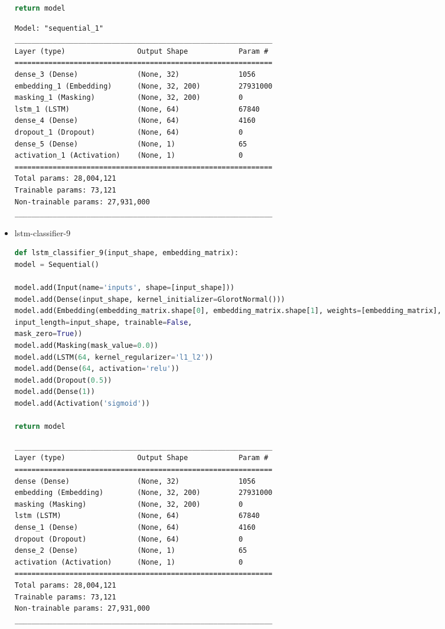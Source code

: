 \documentclass{article}
\begin{document}
\begin{itemize}
\begin{lstlisting}[language=Python, caption=Дефиниция на lstm-classifier-8.]
return model
\end{lstlisting}

\begin{lstlisting}[numbers=none, caption=Обобщение на lstm-classifier-8.]
Model: "sequential_1"
_____________________________________________________________
Layer (type)                 Output Shape            Param #
=============================================================
dense_3 (Dense)              (None, 32)              1056
embedding_1 (Embedding)      (None, 32, 200)         27931000
masking_1 (Masking)          (None, 32, 200)         0
lstm_1 (LSTM)                (None, 64)              67840
dense_4 (Dense)              (None, 64)              4160
dropout_1 (Dropout)          (None, 64)              0
dense_5 (Dense)              (None, 1)               65
activation_1 (Activation)    (None, 1)               0
=============================================================
Total params: 28,004,121
Trainable params: 73,121
Non-trainable params: 27,931,000
_____________________________________________________________
\end{lstlisting}

\item lstm-classifier-9

\begin{lstlisting}[language=Python, caption=Дефиниция на lstm-classifier-9.]
def lstm_classifier_9(input_shape, embedding_matrix):
model = Sequential()

model.add(Input(name='inputs', shape=[input_shape]))
model.add(Dense(input_shape, kernel_initializer=GlorotNormal()))
model.add(Embedding(embedding_matrix.shape[0], embedding_matrix.shape[1], weights=[embedding_matrix],
input_length=input_shape, trainable=False,
mask_zero=True))
model.add(Masking(mask_value=0.0))
model.add(LSTM(64, kernel_regularizer='l1_l2'))
model.add(Dense(64, activation='relu'))
model.add(Dropout(0.5))
model.add(Dense(1))
model.add(Activation('sigmoid'))

return model
\end{lstlisting}

\begin{lstlisting}[numbers=none, caption=Обобщение на lstm-classifier-9.]
_____________________________________________________________
Layer (type)                 Output Shape            Param #
=============================================================
dense (Dense)                (None, 32)              1056
embedding (Embedding)        (None, 32, 200)         27931000
masking (Masking)            (None, 32, 200)         0
lstm (LSTM)                  (None, 64)              67840
dense_1 (Dense)              (None, 64)              4160
dropout (Dropout)            (None, 64)              0
dense_2 (Dense)              (None, 1)               65
activation (Activation)      (None, 1)               0
=============================================================
Total params: 28,004,121
Trainable params: 73,121
Non-trainable params: 27,931,000
_____________________________________________________________
\end{lstlisting}


\end{itemize}
\end{document}

